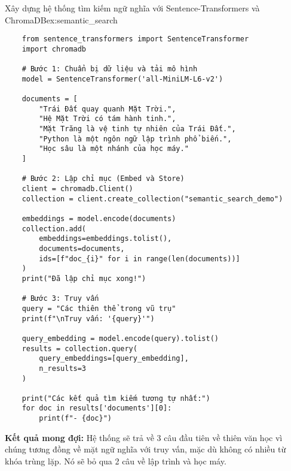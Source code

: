 \begin{example}{Xây dựng hệ thống tìm kiếm ngữ nghĩa với Sentence-Transformers và ChromaDB}{ex:semantic_search}
    \begin{verbatim}
    from sentence_transformers import SentenceTransformer
    import chromadb
    
    # Bước 1: Chuẩn bị dữ liệu và tải mô hình
    model = SentenceTransformer('all-MiniLM-L6-v2') 
    
    documents = [
        "Trái Đất quay quanh Mặt Trời.",
        "Hệ Mặt Trời có tám hành tinh.",
        "Mặt Trăng là vệ tinh tự nhiên của Trái Đất.",
        "Python là một ngôn ngữ lập trình phổ biến.",
        "Học sâu là một nhánh của học máy."
    ]
    
    # Bước 2: Lập chỉ mục (Embed và Store)
    client = chromadb.Client()
    collection = client.create_collection("semantic_search_demo")
    
    embeddings = model.encode(documents)
    collection.add(
        embeddings=embeddings.tolist(),
        documents=documents,
        ids=[f"doc_{i}" for i in range(len(documents))]
    )
    print("Đã lập chỉ mục xong!")
    
    # Bước 3: Truy vấn
    query = "Các thiên thể trong vũ trụ"
    print(f"\nTruy vấn: '{query}'")
    
    query_embedding = model.encode(query).tolist()
    results = collection.query(
        query_embeddings=[query_embedding],
        n_results=3
    )
    
    print("Các kết quả tìm kiếm tương tự nhất:")
    for doc in results['documents'][0]:
        print(f"- {doc}")
    \end{verbatim}
\end{example}

\textbf{Kết quả mong đợi:} Hệ thống sẽ trả về 3 câu đầu tiên về thiên văn học vì chúng tương đồng về mặt ngữ nghĩa với truy vấn, mặc dù không có nhiều từ khóa trùng lặp. Nó sẽ bỏ qua 2 câu về lập trình và học máy.
